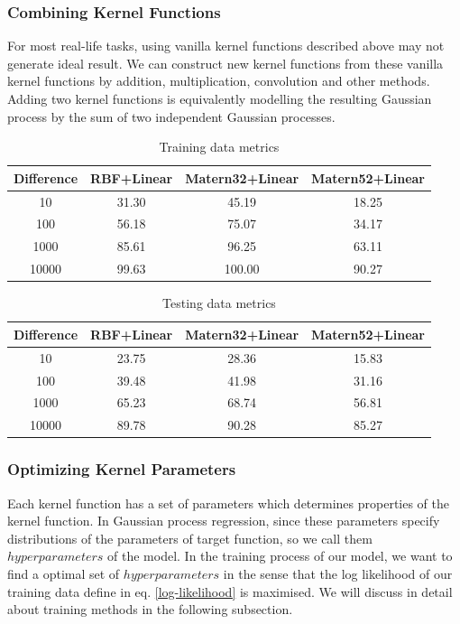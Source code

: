 \documentclass[11pt,a4paper]{article}
\theoremstyle{definition}
\numberwithin{equation}{section}
\begin{document}
\subsubsection*{Combining Kernel Functions}
For most real-life tasks, using vanilla kernel functions described above may not generate ideal result. We can construct new kernel functions from these vanilla kernel functions by addition, multiplication, convolution and other methods. Adding two kernel functions is equivalently modelling the resulting Gaussian process by the sum of two independent Gaussian processes\cite[Rasmussen and Williams, sec 4.2]{RandW}.

\begin{table}[h!]
	\begin{center}
		\caption{Training data metrics}
		\label{tab:table1}
		\begin{tabular}{c|c|c|c}
			\mbox{Difference} &\mbox{RBF+Linear}& \mbox{Matern32+Linear}& \mbox{Matern52+Linear}\\
			\hline
			10&31.30&	45.19&	18.25\\
			100&56.18&	75.07&	34.17\\
			1000&85.61&	96.25&	63.11\\
			10000&99.63	&100.00	&90.27
		\end{tabular}
	\end{center}
\end{table}

\begin{table}[h!]
	\begin{center}
		\caption{Testing data metrics}
		\label{tab:table1}
		\begin{tabular}{c|c|c|c}
			\mbox{Difference} &\mbox{RBF+Linear}& \mbox{Matern32+Linear}& \mbox{Matern52+Linear}\\
			\hline
			10&23.75&	28.36&	15.83\\
			100&39.48&	41.98&	31.16\\
			1000&65.23&	68.74&	56.81\\
			10000&89.78&	90.28&	85.27
		\end{tabular}
	\end{center}
\end{table}


\subsubsection{Optimizing Kernel Parameters}
Each kernel function has a set of parameters which determines properties of the kernel function. In Gaussian process regression, since these parameters specify distributions of the parameters of target function, so we call them $hyperparameters$ of the model. In the training process of our model, we want to find a optimal set of $hyperparameters$ in the sense that the log likelihood of our training data define in eq. \ref{log-likelihood} is maximised. We will discuss in detail about training methods in the following subsection.
\end{document}
